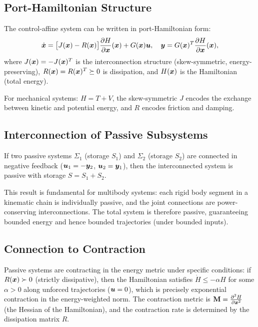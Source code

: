 \subsection{Port-Hamiltonian Structure}

The control-affine system can be written in port-Hamiltonian form:
\begin{equation}
\dot{\bm{x}} = \bigl[J(\bm{x}) - R(\bm{x})\bigr] \frac{\partial H}{\partial \bm{x}}(\bm{x}) + G(\bm{x})\bm{u},
\quad \bm{y} = G(\bm{x})^T \frac{\partial H}{\partial \bm{x}}(\bm{x}),
\label{eq:ch3:port-hamiltonian}
\end{equation}
where $J(\bm{x}) = -J(\bm{x})^T$ is the interconnection structure (skew-symmetric, energy-preserving),
$R(\bm{x}) = R(\bm{x})^T \succeq 0$ is dissipation, and $H(\bm{x})$ is the Hamiltonian (total energy).

For mechanical systems: $H = T + V$, the skew-symmetric $J$ encodes the exchange between
kinetic and potential energy, and $R$ encodes friction and damping.

\subsection{Interconnection of Passive Subsystems}

\begin{theorem}
\label{thm:ch3:passive-interconnection}
If two passive systems $\Sigma_1$ (storage $S_1$) and $\Sigma_2$ (storage $S_2$) are
connected in negative feedback ($\bm{u}_1 = -\bm{y}_2$, $\bm{u}_2 = \bm{y}_1$), then the
interconnected system is passive with storage $S = S_1 + S_2$.
\end{theorem}

This result is fundamental for multibody systems: each rigid body segment in a kinematic
chain is individually passive, and the joint connections are power-conserving
interconnections. The total system is therefore passive, guaranteeing bounded energy
and hence bounded trajectories (under bounded inputs).

\subsection{Connection to Contraction}

Passive systems are contracting in the energy metric under specific conditions:
if $R(\bm{x}) \succ 0$ (strictly dissipative), then the Hamiltonian satisfies
$\dot{H} \leq -\alpha H$ for some $\alpha > 0$ along unforced trajectories ($\bm{u} = 0$),
which is precisely exponential contraction in the energy-weighted norm. The contraction
metric is $\mathbf{M} = \frac{\partial^2 H}{\partial \bm{x}^2}$ (the Hessian of the Hamiltonian),
and the contraction rate is determined by the dissipation matrix $R$.

